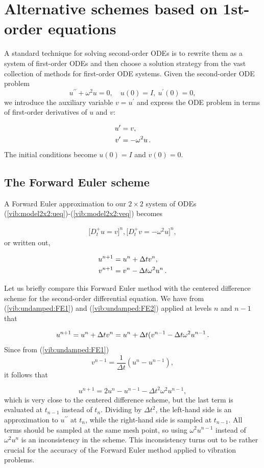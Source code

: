 \documentclass[%
oneside,                 %
final,                   %
10pt]{article}
\begin{document}
\section{Alternative schemes based on 1st-order equations}
\label{vib:model2x2}

A standard technique for solving second-order ODEs is
to rewrite them as a system of first-order ODEs and then choose a
solution strategy from the
vast collection of methods for first-order ODE systems.
Given the second-order ODE problem
\[ u^{\prime\prime} + \omega^2 u = 0,\quad u(0)=I,\ u^{\prime}(0)=0,\]
we introduce the auxiliary variable $v=u^{\prime}$ and express the ODE problem
in terms of first-order derivatives of $u$ and $v$:

\begin{align}
u^{\prime} &= v,
\label{vib:model2x2:ueq}\\ 
v' &= -\omega^2 u
\label{vib:model2x2:veq}
\tp
\end{align}
The initial conditions become $u(0)=I$ and $v(0)=0$.



\subsection{The Forward Euler scheme}

A Forward Euler approximation to our $2\times 2$ system of ODEs
(\ref{vib:model2x2:ueq})-(\ref{vib:model2x2:veq})
becomes

\begin{align}
\lbrack D_t^+ u = v\rbrack^n,
\lbrack D_t^+ v = -\omega^2 u\rbrack^n,
\end{align}
or written out,

\begin{align}
u^{n+1} &= u^n + \Delta t v^n,
\label{vib:undamped:FE1}\\ 
v^{n+1} &= v^n -\Delta t \omega^2 u^n
\label{vib:undamped:FE2}
\tp
\end{align}


Let us briefly compare this Forward Euler method with the
centered difference scheme for the second-order differential
equation. We have from (\ref{vib:undamped:FE1}) and
(\ref{vib:undamped:FE2}) applied at levels $n$ and $n-1$ that

\[ u^{n+1} = u^n + \Delta t v^n = u^n + \Delta t (v^{n-1} -\Delta t \omega^2 u^{n-1}\tp\]
Since from (\ref{vib:undamped:FE1})
\[ v^{n-1} = \frac{1}{\Delta t}(u^{n}-u^{n-1}),\]
it follows that

\[ u^{n+1} = 2u^n - u^{n-1} -\Delta t^2\omega^2 u^{n-1},\]
which is very close to the centered difference scheme, but
the last term is evaluated at $t_{n-1}$ instead of $t_n$.
Dividing by $\Delta t^2$, the left-hand side is an approximation to
$u^{\prime\prime}$ at $t_n$, while the right-hand side is sampled at $t_{n-1}$.
All terms should be sampled at the same mesh point, so using
$\omega^2 u^{n-1}$ instead of $\omega^2 u^n$ is an inconsistency
in the scheme. This inconsistency turns out to be rather
crucial for the accuracy of
the Forward Euler method applied to vibration problems.
\end{document}

